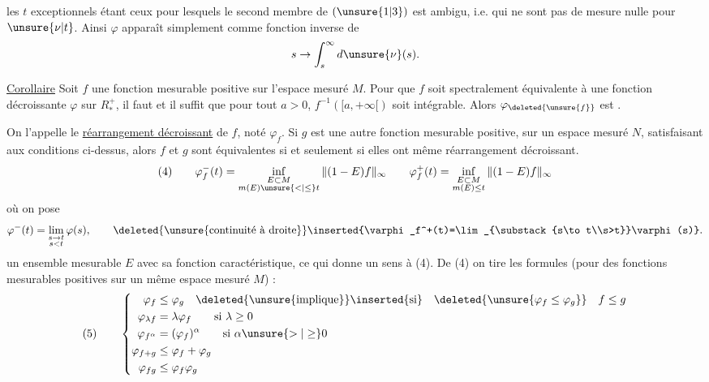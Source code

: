 les \(t\) exceptionnels étant ceux pour lesquels le second membre de \((\unsure{1|3})\) est ambigu, i.e. qui ne sont pas de mesure nulle pour \(\unsure{\nu|t}\). Ainsi \(\varphi\) apparaît simplement comme fonction inverse de
\[
s\to\int_s^\infty d\unsure{\nu}(s).
\]

\uline{Corollaire} Soit \(f\) une fonction mesurable positive sur l'espace mesuré \(M\). Pour que \(f\) soit spectralement équivalente à une fonction décroissante \(\varphi\) sur \(R_*^+\), il faut et il suffit que pour tout \(a>0\), \(f^{-1}([a,+\infty[)\) soit intégrable. Alors \(\varphi_{\deleted{\unsure{f}}}\) est  .

 On l'appelle le \uline{réarrangement décroissant} de \(f\), noté \(\varphi_f\). Si  \(g\) est une autre fonction mesurable positive, sur un espace mesuré \(N\), satisfaisant aux conditions ci-dessus, alors \(f\) et \(g\) sont  équivalentes si et seulement si elles ont même réarrangement décroissant.
\[
(4)\qquad
\varphi_f^-(t)=\inf_{\substack{E\subset M\\m(E)\unsure{<|\leq}t}}\|(1-E)f\|_\infty
\qquad
\varphi_f^+(t)=\inf_{\substack{E\subset M\\m(E)\leq t}}\|(1-E)f\|_\infty
\]
où  on pose
\[
\varphi^-(t)=\lim_{\substack{s\to t\\s<t}}\varphi(s),
\qquad\deleted{\unsure{\text{continuité à droite}}}\inserted{\varphi_f^+(t)=\lim_{\substack{s\to t\\s>t}}\varphi(s)}.
\]
 un ensemble mesurable \(E\) avec sa fonction caractéristique, ce qui donne un sens à (4). De (4) on tire les formules (pour des fonctions mesurables positives sur un même espace mesuré \(M\))  :
\[
(5)\qquad
\left\{\begin{aligned}
\varphi_f&\leq\varphi_g\quad\deleted{\unsure{\text{implique}}}\inserted{\text{si}}\quad\deleted{\unsure{\varphi_f\leq\varphi_g}}\quad f\leq g\\
\varphi_{\lambda f}&=\lambda\varphi_f\qquad\text{si }\lambda\geq0\\
\varphi_{f^\alpha}&=(\varphi_f)^\alpha\qquad\text{si }\alpha\unsure{>|\geq}0\\
\varphi_{f+g}&\leq\varphi_f+\varphi_g\\
\varphi_{fg}&\leq\varphi_f\varphi_g
\end{aligned}\right.
\]
